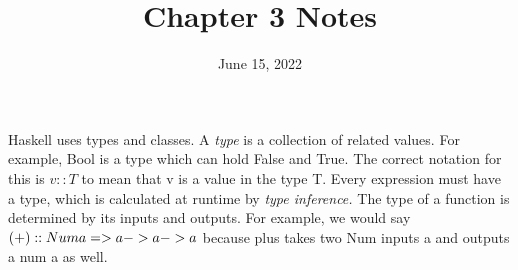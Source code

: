 \documentclass[12pt, letterpaper]{article}
\title{Chapter 3 Notes}
\date{June 15, 2022}
\begin{document}
    \textnormal{Haskell uses types and classes.} \newline
    \textnormal{A \textit{type} is a collection of related values. 
    For example, Bool is a type which can hold False and True. The correct notation for this is}
    \begin{math}
        v :: T
    \end{math}
    \textnormal{to mean that v is a value in the type T. 
    Every expression must have a type, which is calculated at runtime by \textit{type inference.}
    The type of a function is determined by its inputs and outputs. For example, we would say}\newline
    \begin{math}
        (+) :: Num \space a => a -> a -> a
    \end{math}\newline
    \textnormal{
        because plus takes two Num inputs a and outputs a num a as well. 
    }
\end{document}
